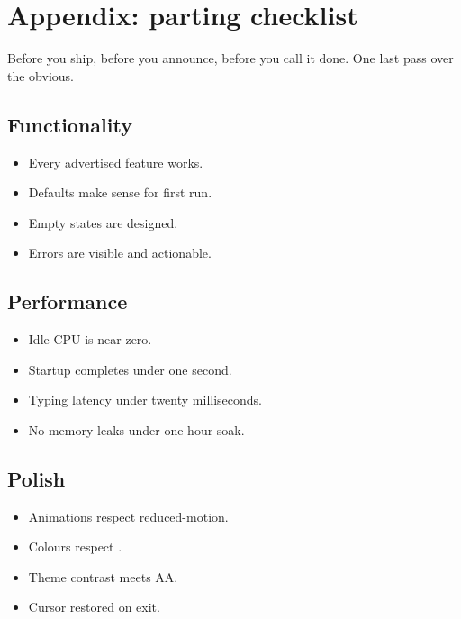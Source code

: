 \chapter{Appendix: parting checklist}
\label{ch:partingchecklist}

\begin{aside}
Before you ship, before you announce, before you call it
done. One last pass over the obvious.
\end{aside}

\section{Functionality}

\begin{itemize}[leftmargin=*]
  \item Every advertised feature works.
  \item Defaults make sense for first run.
  \item Empty states are designed.
  \item Errors are visible and actionable.
\end{itemize}

\section{Performance}

\begin{itemize}[leftmargin=*]
  \item Idle CPU is near zero.
  \item Startup completes under one second.
  \item Typing latency under twenty milliseconds.
  \item No memory leaks under one-hour soak.
\end{itemize}

\section{Polish}

\begin{itemize}[leftmargin=*]
  \item Animations respect reduced-motion.
  \item Colours respect .
  \item Theme contrast meets AA.
  \item Cursor restored on exit.
\end{itemize}


